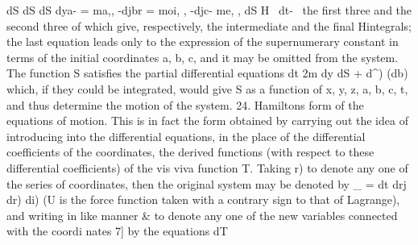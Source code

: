\documentclass[12pt,a4paper]{article}
\theoremstyle{definition}
\begin{document}
dS dS dS
dya-
= ma,,
-djbr
= moi,
, -djc-
me,
,
dS
H
~dt-~
the first three and the second three of which give, respectively, the intermediate and
the final Hintegrals; the last equation leads only to the expression of the supernumerary
constant in terms of the initial coordinates a, b, c, and it may be omitted from the
system.
The function S satisfies the partial differential equations
dt 2m \dx dy \dz
dS
+
d^) (db)
which, if they could be integrated, would give S as a function of x, y, z, a, b, c, t,
and thus determine the motion of the system.
24. Hamiltons form of the equations of motion. This is in fact the form obtained
by carrying out the idea of introducing into the differential equations, in the place
of the differential coefficients of the coordinates, the derived functions (with respect to
these differential coefficients) of the vis viva function T. Taking r) to denote any one
of the series of coordinates, then the original system may be denoted by
_ =
dt drj dr) di)
(U is the force function taken with a contrary sign to that of Lagrange), and writing
in like manner & to denote any one of the new variables connected with the coordi
nates 7] by the equations
dT


\end{document}
